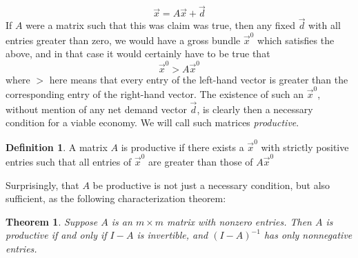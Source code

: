 \documentclass{article}
\theoremstyle{definition}
\newtheorem{definition}{Definition}[section]
\theoremstyle{plain}
\theoremstyle{theorem}
\newtheorem{theorem}{Theorem}[section]
\begin{document}
\[ \vec{x} = A\vec{x} + \vec{d} \]
If $A$ were a matrix such that this was claim was true, then any fixed $\vec{d}$ with all entries greater than zero, we would have a gross bundle $\vec{x}^0$ which satisfies the above, and in that case it would certainly have to be true that 
\[ \vec{x}^0 > A\vec{x}^0 \]
where $>$ here means that every entry of the left-hand vector is greater than the corresponding entry of the right-hand vector. The existence of such an $\vec{x}^0$, without mention of any net demand vector $\vec{d}$, is clearly then a necessary condition for a viable economy. We will call such matrices \textit{productive}.
\begin{definition}
	A matrix $A$ is productive if there exists a $\vec{x}^0$ with strictly positive entries such that all entries of $\vec{x}^0$ are greater than those of $A\vec{x}^0$ 
\end{definition}
Surprisingly, that $A$ be productive is not just a necessary condition, but also sufficient, as the following characterization theorem:
\begin{theorem}
	Suppose $A$ is an $m\times m$ matrix with nonzero entries. Then $A$ is productive if and only if $I-A$ is invertible, and $(I-A)^{-1}$ has only nonnegative entries.
\end{theorem}
\end{document}
